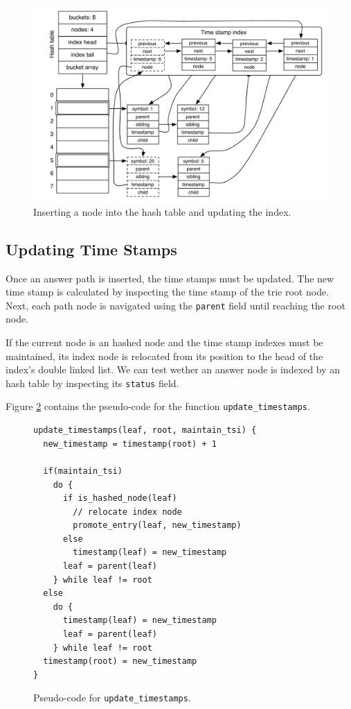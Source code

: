 \begin{figure}[ht]
  \centering
    \includegraphics[scale=0.6]{hash_table_insert.pdf}
  \caption{Inserting a node into the hash table and updating the index.}
  \label{fig:hash_table_insert}
\end{figure}

\subsection{Updating Time Stamps}

Once an answer path is inserted, the time stamps must be updated.
The new time stamp is calculated by inspecting the time stamp of the trie root node.
Next, each path node is navigated using the \texttt{parent} field until reaching the root node.

If the current node is an hashed node and the time stamp indexes
must be maintained, its index node is relocated from its position to the head of the index's double linked list. We can test wether an answer node is indexed by an hash table by inspecting
its \texttt{status} field.

Figure \ref{fig:update_timestamps} contains the pseudo-code for the function \texttt{update\_timestamps}.

\begin{figure}[ht]
\begin{Verbatim}
update_timestamps(leaf, root, maintain_tsi) {
  new_timestamp = timestamp(root) + 1
  
  if(maintain_tsi)
    do {
      if is_hashed_node(leaf)
        // relocate index node
        promote_entry(leaf, new_timestamp)
      else
        timestamp(leaf) = new_timestamp
      leaf = parent(leaf)
    } while leaf != root
  else
    do {
      timestamp(leaf) = new_timestamp
      leaf = parent(leaf)
    } while leaf != root
  timestamp(root) = new_timestamp
}
\end{Verbatim}
\caption{Pseudo-code for \texttt{update\_timestamps}.}
\label{fig:update_timestamps}
\end{figure}

